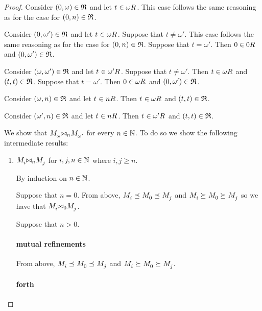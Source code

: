 \begin{proof}
Consider $(0, \omega) \in \mathfrak{R}$ and let $\kStateT \in \kSuccessors{}{\omega}$. 
This case follows the same reasoning as for the case for $(0, n) \in \mathfrak{R}$.

Consider $(0, \omega') \in \mathfrak{R}$ and let $\kStateT \in \kSuccessors{}{\omega}$. 
Suppose that $t \neq \omega'$. 
This case follows the same reasoning as for the case for $(0, n) \in \mathfrak{R}$. 
Suppose that $t = \omega'$. 
Then $0 \in \kSuccessors{}{0}$ and $(0, \omega') \in \mathfrak{R}$.

Consider $(\omega, \omega') \in \mathfrak{R}$ and let $\kStateT \in \kSuccessors{}{\omega'}$. 
Suppose that $t \neq \omega'$. 
Then $t \in \kSuccessors{}{\omega}$ and $(t, t) \in \mathfrak{R}$. 
Suppose that $t = \omega'$. 
Then $0 \in \kSuccessors{}{\omega}$ and $(0, \omega') \in \mathfrak{R}$.

Consider $(\omega, n) \in \mathfrak{R}$ and let $\kStateT \in \kSuccessors{}{n}$.
Then $\kStateT \in \kSuccessors{}{\omega}$ and $(t, t) \in \mathfrak{R}$.

Consider $(\omega', n) \in \mathfrak{R}$ and let $\kStateT \in \kSuccessors{}{n}$.
Then $\kStateT \in \kSuccessors{}{\omega'}$ and $(t, t) \in \mathfrak{R}$.

We show that $\kPModel{\omega} \bisimref[n] \kPModel{\omega'}$ for every $n \in \mathbb{N}$. 
To do so we show the following intermediate results:

\begin{enumerate}
    \item $\kPModel{i} \bisimref[n] \kPModel{j}$ for $i, j, n \in \mathbb{N}$ where $i, j \geq n$.

    By induction on $n \in \mathbb{N}$.

    Suppose that $n = 0$. 
    From above, $\kPModel{i} \refines \kPModel{0} \refines \kPModel{j}$ and $\kPModel{i} \simulates \kPModel{0} \simulates \kPModel{j}$ so we have that $\kPModel{i} \bisimref[0] \kPModel{j}$.

    Suppose that $n > 0$.

    \paragraph{mutual refinements}

    From above, $\kPModel{i} \refines \kPModel{0} \refines \kPModel{j}$
    and $\kPModel{i} \simulates \kPModel{0} \simulates \kPModel{j}$.

    \paragraph{forth}


\end{enumerate}
\end{proof}
